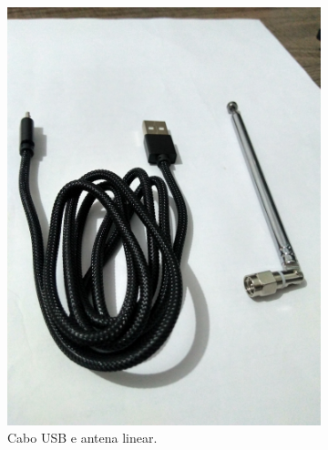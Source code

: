 \documentclass[
  12pt,				%
  openright,			%
  twoside,			%
  a4paper,			%
  english,			%
  french,				%
  spanish,			%
  brazil,				%
  ]{abntex2}
\begin{document}
\newpage
\begin{figure}[ht]
  \centering
  \begin{subfigure}[b]{0.45\linewidth}
    \centering
    \includegraphics[width=\linewidth]{figures/hackrf/hack_rf_cabo_usb_antena_linear.jpg}
    \caption{Cabo USB e antena linear.}
    \label{fig:hack_rf_cabo_usb_antena_linear}
  \end{subfigure}
  \hspace{0.5cm}
  \begin{subfigure}[b]{0.45\linewidth}
    \centering

\end{subfigure}
\end{figure}
\end{document}
